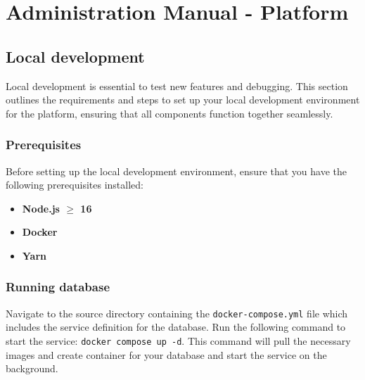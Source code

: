 \chapter{Administration Manual - Platform}
\label{attachments:admin-manual-platform}

\section{Local development}
\label{attachments:admin-manual-local-development}
Local development is essential to test new features and debugging. This section outlines the requirements and steps to set up your local development environment for the platform, ensuring that all components function together seamlessly.


\subsection{Prerequisites}
Before setting up the local development environment, ensure that you have the following prerequisites installed:
\begin{itemize}
    \item \textbf{Node.js $\geq$ 16}
    \item \textbf{Docker}
    \item \textbf{Yarn}
\end{itemize}

\subsection{Running database}
Navigate to the source directory containing the \texttt{docker-compose.yml} file which includes the service definition for the database.
Run the following command to start the service:
\texttt{docker compose up -d}.
This command will pull the necessary images and create container for your database and start the service on the background.

